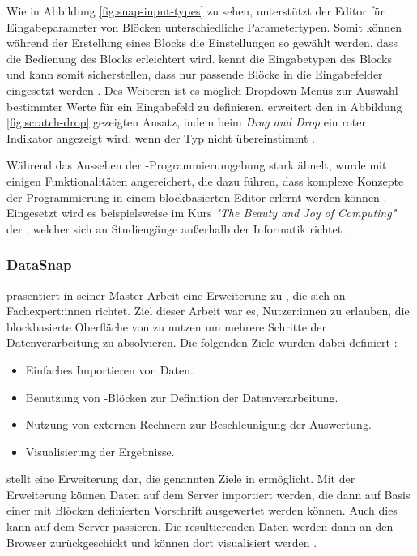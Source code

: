 Wie in Abbildung \ref{fig:snap-input-types} zu sehen, unterstützt der Editor für Eingabeparameter von Blöcken unterschiedliche Parametertypen. Somit können während der Erstellung eines Blocks die Einstellungen so gewählt werden, dass die Bedienung des Blocks erleichtert wird. \Snap{} kennt die Eingabetypen des Blocks und kann somit sicherstellen, dass nur passende Blöcke in die Eingabefelder eingesetzt werden \parencite{harveySnapReference2020}. Des Weiteren ist es möglich Dropdown-Menüs zur Auswahl bestimmter Werte für ein Eingabefeld zu definieren. \Snap{} erweitert den in Abbildung \ref{fig:scratch-drop} gezeigten Ansatz, indem beim \textit{Drag and Drop} ein roter Indikator angezeigt wird, wenn der Typ nicht übereinstimmt \parencite{harveySnapReference2020}.

Während das Aussehen der \Snap{}-Programmierumgebung \Scratch{} stark ähnelt, wurde \Snap{} mit einigen Funktionalitäten angereichert, die dazu führen, dass komplexe Konzepte der Programmierung in einem blockbasierten Editor erlernt werden können \parencite{ballSnapLook2019}. Eingesetzt wird es beispielsweise im Kurs \textit{"The Beauty and Joy of Computing"} der \citeauthor{universityofcaliforniaberkeleyBeautyJoy}, welcher sich an Studiengänge außerhalb der Informatik richtet \parencite{universityofcaliforniaberkeleyBeautyJoy}.

\subsubsection{DataSnap}
\citeauthor{hellmannDataSnapEnabling2015} präsentiert in seiner Master-Arbeit eine Erweiterung zu \Snap{}, die sich an Fachexpert:innen richtet. Ziel dieser Arbeit war es, Nutzer:innen zu erlauben, die blockbasierte Oberfläche von \Snap{} zu nutzen um mehrere Schritte der Datenverarbeitung zu absolvieren. Die folgenden Ziele wurden dabei definiert \parencite{hellmannDataSnapEnabling2015}:

\begin{itemize}
  \item Einfaches Importieren von Daten.
  \item Benutzung von \Snap{}-Blöcken zur Definition der Datenverarbeitung.
  \item Nutzung von externen Rechnern zur Beschleunigung der Auswertung.
  \item Visualisierung der Ergebnisse.
\end{itemize}

\DataSnap{} stellt eine Erweiterung dar, die genannten Ziele in \Snap{} ermöglicht. Mit der Erweiterung können Daten auf dem Server importiert werden, die dann auf Basis einer mit Blöcken definierten Vorschrift ausgewertet werden können. Auch dies kann auf dem Server passieren. Die resultierenden Daten werden dann an den Browser zurückgeschickt und können dort visualisiert werden \parencite{hellmannDataSnapEnabling2015}.

